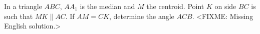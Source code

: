 \problem
In a triangle $ABC$, $A A_1$ is the median and $M$ the centroid.
Point $K$ on side $BC$ is such that $MK \parallel AC$.
If $AM = CK$, determine the angle $ACB$.
\solution
<FIXME: Missing English solution.>
\endproblem
